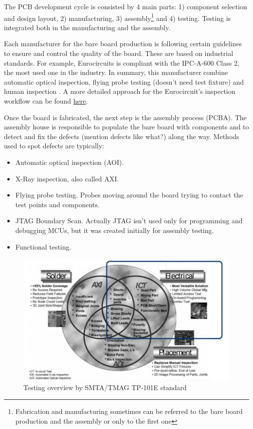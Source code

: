 \documentclass[final]{cubedoc}
\begin{document}
	The PCB development cycle is consisted by 4 main parts: 1) component selection and design layout, 2) manufacturing, 3) assembly\footnote{Fabrication and manufacturing sometimes can be referred to the bare board production and the assembly or only to the first one} and 4) testing. Testing is integrated both in the manufacturing and the assembly.
	
	Each manufacturer for the bare board production is following certain guidelines to ensure and control the quality of the board. These are based on industrial standards. For example, Eurocircuits is compliant with the IPC-A-600 Class 2, the most used one in the industry. In summary, this manufacturer combine  automatic optical inspection, flying probe testing (doesn't need test fixture) and human inspection \cite{eurocircuits:stepbystep}. A more detailed approach for the Eurocircuit's inspection workflow can be found \href{https://web.archive.org/web/20200814201544/https://www.eurocircuits.com/blog/how-do-we-assure-the-quality-of-your-pcb-part-1/}{here}.
	
	Once the board is fabricated, the next step is the assembly process (PCBA). The assembly house is responsible to populate the bare board with components and to detect and fix the defects (mention defects like what?) along the way. Methods used to spot defects are typically:
	\begin{itemize}
		\item Automatic optical inspection (AOI).
		\item X-Ray inspection, also called AXI.
		\item Flying probe testing. Probes moving around the board trying to contact the test points and components.
		\item JTAG Boundary Scan. Actually JTAG isn't used only for programming and debugging MCUs, but it was created initially for assembly testing.
		\item Functional testing. 
	\end{itemize} 
	
	\begin{figure}[h!]
		\centering
		\includegraphics[keepaspectratio, width = \textwidth, height=.4\textheight]{assets/testing_overview.png}
		\caption{Testing overview by SMTA/TMAG TP-101E standard}
	\end{figure}
	
\end{document}
